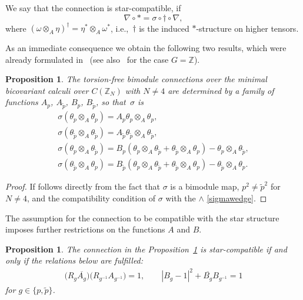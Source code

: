 \documentclass[10pt,a4paper]{amsart}
\numberwithin{equation}{section}
\newtheorem{Proposition}[Theorem]{Proposition}
 { \theoremstyle{definition}
\newtheorem{Definition}[Theorem]{Definition}
\newtheorem{Example}[Theorem]{Example}
\newtheorem{Remark}[Theorem]{Remark} }
\newcommand{\Z}{\mathbb{Z}}
\newcommand{\ip}{{\tilde{p}}}
\begin{document}
\begin{Definition}
We say that the connection is star-compatible, if
\[ \nabla\circ \ast=\sigma\circ \dagger \circ \nabla,\]
where $(\omega\otimes_A \eta)^\dagger=\eta^\ast\otimes_A\omega^\ast$, i.e.,~$\dagger$ is the induced $\ast$-structure on higher tensors.
\end{Definition}

As an immediate consequence we obtain the following two results, which were already formulated in~\cite{majid2020}
(see also~\cite{M2} for the case $G=\mathbb{Z}$).

\begin{Proposition}\label{sigmy}The torsion-free bimodule connections over the minimal bicovariant calculi over $C(\Z_N)$ with $N\neq 4$ are determined by a family of functions $A_p$, $A_\ip$, $B_p$, $B_\ip$, so that~$\sigma$ is
\begin{gather*}
 \sigma(\theta_p \otimes_A \theta_p) = A_p \theta_p \otimes_A \theta_p,\\
\sigma(\theta_\ip \otimes_A \theta_\ip) = A_\ip \theta_\ip \otimes_A \theta_\ip, \\
\sigma(\theta_p \otimes_A \theta_\ip) = B_p ( \theta_p \otimes_A \theta_\ip + \theta_\ip \otimes_A \theta_p ) - \theta_p \otimes_A \theta_\ip, \\
\sigma(\theta_\ip \otimes_A \theta_p) = B_\ip ( \theta_p \otimes_A \theta_\ip + \theta_\ip \otimes_A \theta_p ) - \theta_\ip \otimes_A \theta_p.
\end{gather*}
\end{Proposition}
\begin{proof}
If follows directly from the fact that $\sigma$ is a bimodule map, $p^2\neq \ip^2$ for $N\neq 4$, and the compatibility condition
of $\sigma$ with the $\wedge$ \eqref{sigmawedge}.
\end{proof}
The assumption for the connection to be compatible with the star structure imposes further restrictions on the functions $A$ and $B$.
\begin{Proposition}
The connection in the Proposition~{\rm \ref{sigmy}} is star-compatible if and only if the relations below are fulfilled:
\begin{gather}
\big(R_{g}\overline{A_g}\big)\big(R_{g^{-1}}A_{g^{-1}}\big)=1,\qquad
|B_g-1|^2 + \overline{B_g}B_{g^{-1}}=1\label{star-connection}
\end{gather}
for $g\in\{p,\ip\}$.
\end{Proposition}
\end{document}
